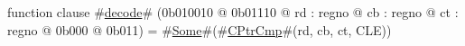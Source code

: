 function clause #\hyperref[zdecode]{decode}# (0b010010 @ 0b01110 @ rd : regno @ cb : regno @ ct : regno @ 0b000 @ 0b011) = #\hyperref[zSome]{Some}#(#\hyperref[zCPtrCmp]{CPtrCmp}#(rd, cb, ct, CLE))
